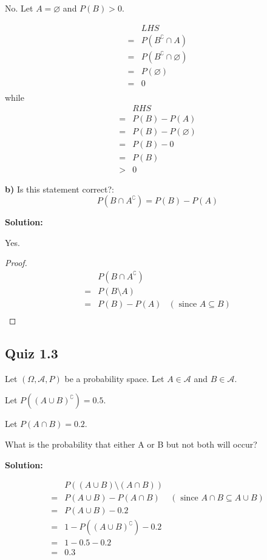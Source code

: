 \documentclass{article}
\begin{document}
No. Let \(A=\varnothing\) and \(P(B)>0\).

\begin{align*}
	 & LHS \\
	=& P(B^\complement \cap A) \\
	=& P(B^\complement \cap \varnothing) \\
	=& P(\varnothing) \\
	=& 0 \\
\end{align*}
while
\begin{align*}
	  & RHS \\
	 =& P(B)-P(A) \\
	 =& P(B)-P(\varnothing) \\
	 =& P(B)-0 \\
	 =& P(B) \\
	 >& 0
\end{align*}

\textbf{b)} Is this statement correct?:
\[P(B \cap A^\complement) = P(B)-P(A)\]

\textbf{Solution:}

Yes.
\begin{proof}
\begin{align*}
	 & P(B\cap A^\complement) \\
	=& P(B\setminus A) \\
	=& P(B)-P(A) & (\text{ since }A\subseteq B) \\
\end{align*}
\end{proof}
\subsection{Quiz 1.3}

Let \((\Omega, \mathcal{A}, P)\) be a probability space.
Let \(A\in \mathcal{A}\) and \(B\in \mathcal{A}\).

Let \(P((A\cup B)^\complement)=0.5\).

Let \(P(A\cap B)=0.2\).

What is the probability that either A or B but not both will occur?

\textbf{Solution:}

\begin{align*}
	 & P((A\cup B)\setminus(A\cap B)) \\
	=& P(A\cup B)-P(A\cap B) & (\text{ since }A\cap B \subseteq A\cup B) \\
	=& P(A\cup B)-0.2 \\
	=& 1-P((A \cup B)^\complement)-0.2 \\
	=& 1-0.5-0.2 \\
	=& 0.3 \\
\end{align*}
\end{document}
